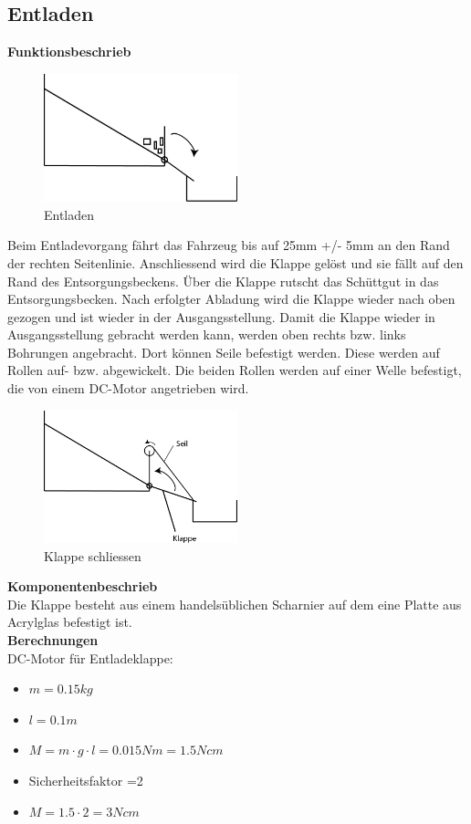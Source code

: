 \subsection{Entladen}
%
\textbf{Funktionsbeschrieb}\\[0.2cm]
\begin{figure}[H]
\centering
\includegraphics[width=0.5\textwidth]{03_Loesungskonzept/pictures/Entladen_Schraegbehaelter.png}
\caption{Entladen}
\end{figure}\flushleft
%
Beim Entladevorgang fährt das Fahrzeug bis auf 25mm +/- 5mm an den Rand der rechten Seitenlinie. Anschliessend wird die Klappe gelöst und sie fällt auf den Rand des Entsorgungsbeckens. Über die Klappe rutscht das Schüttgut in das Entsorgungsbecken. Nach erfolgter Abladung wird die Klappe wieder nach oben gezogen und ist wieder in der Ausgangsstellung.
%
Damit die Klappe wieder in Ausgangsstellung gebracht werden kann, werden oben rechts bzw. links Bohrungen angebracht. Dort können Seile befestigt werden. Diese werden auf Rollen auf- bzw. abgewickelt. Die beiden Rollen werden auf einer Welle befestigt, die von einem DC-Motor angetrieben wird.\\[0.2cm]
\begin{figure}[H]
\centering
\includegraphics[width=0.5\textwidth]{03_Loesungskonzept/pictures/Klappe_schliessen.png}
\caption{Klappe schliessen}
\end{figure}\flushleft
%
\textbf{Komponentenbeschrieb}\\[0.2cm]
Die Klappe besteht aus einem handelsüblichen Scharnier auf dem eine Platte aus Acrylglas befestigt ist.\\[0.2cm]
%
\textbf{Berechnungen}\\[0.2cm]
DC-Motor für Entladeklappe:
\begin{itemize}
\item $m = 0.15kg$
\item $l = 0.1m$
\item $M = m\cdot g\cdot l = 0.015Nm = 1.5Ncm$
\item Sicherheitsfaktor =2
\item $M = 1.5\cdot 2 = 3Ncm$
\end{itemize} 